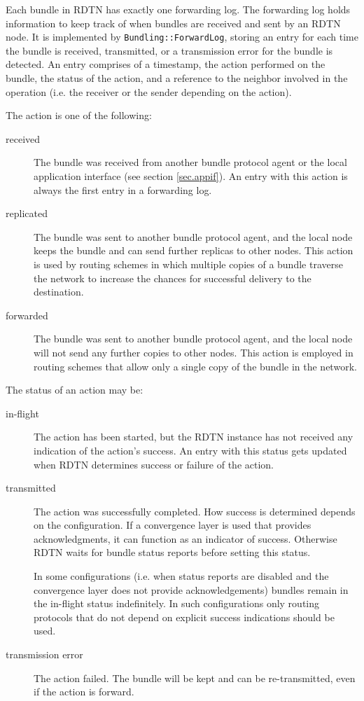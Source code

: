 \documentclass{article}
\begin{document}
Each bundle in RDTN has exactly one forwarding log. The forwarding log holds
information to keep track of when bundles are received and sent by an RDTN node.
It is implemented by {\tt Bundling::ForwardLog}, storing an entry for each time
the bundle is received, transmitted, or a transmission error for the bundle is
detected. An entry comprises of a timestamp, the action performed on the bundle,
the status of the action, and a reference
to the neighbor involved in the operation (i.e. the receiver or the sender
depending on the action).

The action is one of the following:
\begin{description}

\item[received] The bundle was received from another bundle protocol agent or
the local application interface (see section \ref{sec.appif}). An entry with
this action is always the first entry in a forwarding log.

\item[replicated] The bundle was sent to another bundle protocol agent, and the
local node keeps the bundle and can send further replicas to other nodes. This
action is used by routing schemes in which multiple copies of a bundle traverse
the network to increase the chances for successful delivery to the destination.

\item[forwarded] The bundle was sent to another bundle protocol agent, and the
local node will not send any further copies to other nodes. This action is
employed in routing schemes that allow only a single copy of the bundle in the
network.

\end{description}

The status of an action may be:
\begin{description}

\item[in-flight] The action has been started, but the RDTN instance has not
received any indication of the action's success. An entry with this status gets
updated when RDTN determines success or failure of the action.

\item[transmitted] The action was successfully completed. How success is
determined depends on the configuration. If a convergence layer is used that
provides acknowledgments, it can function as an indicator of success. Otherwise
RDTN waits for bundle status reports before setting this status.

In some configurations (i.e. when status reports are disabled and the
convergence layer does not provide acknowledgements) bundles remain in the
in-flight status indefinitely. In such configurations only routing protocols
that do not depend on explicit success indications should be used.

\item[transmission error] The action failed. The bundle will be kept and can be
re-transmitted, even if the action is forward.

\end{description}
\end{document}
